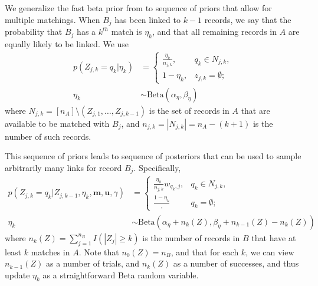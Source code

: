 \documentclass[12pt,letterpaper]{article}
\newcommand{\1}[1]{\mathbb{I}\!\left[#1\right]} %
\begin{document}
We generalize the fast beta prior from \cite{kundinger_2023} to sequence of priors that allow for multiple matchings. When $B_j$ has been linked to $k-1$ records, we say that the probability that $B_j$ has a $k^{th}$ match is $\eta_k$, and that all remaining records in $A$ are equally likely to be linked. We use
\begin{align} \label{eqn:sequential_prior}
	p(Z_{j, k} = q_k|\eta_k) &= \begin{cases}
		\frac{\eta_k}{n_{j, k}}, &  q_k \in N_{j, k}, \\
		1 - \eta_k, & z_{j, k} = \emptyset;
	\end{cases} \\
	\eta_k &\sim \text{Beta}(\alpha_{\eta}, \beta_{\eta})
\end{align}
where $N_{j, k} = [n_A] \setminus (Z_{j, 1}, \ldots, Z_{j, k-1})$ is the set of records in $A$ that are available to be matched with $B_j$, and $n_{j, k} = |N_{j, k}| = n_A - (k + 1)$ is the number of such records. 

This sequence of priors leads to sequence of posteriors that can be used to sample arbitrarily many links for record $B_j$. Specifically,
\begin{align} \label{eqn:sequential_posterior}
	p(Z_{j, k} = q_k|Z_{j, k-1}, \eta_k, \bm{m}, \bm{u}, \gamma) &= \begin{cases}
		\frac{\eta_k}{n_{j, k}} w_{q_k, j}, & q_k \in N_{j, k}, \\
		\frac{1 - \eta_k}, & q_k= \emptyset;
	\end{cases} \\
	\eta_k &\sim \text{Beta}(\alpha_{\eta} + n_k(Z), \beta_{\eta} + n_{k-1}(Z) - n_k(Z))
\end{align}
where $n_k(Z) = \sum_{j=1}^{n_B} I( |Z_j| \geq k)$ is the number of records in $B$ that have at least $k$ matches in $A$. Note that $n_0(Z) = n_B$, and that for each $k$, we can view $n_{k-1}{(Z)}$ as a number of trials, and $n_{k}{(Z)}$ as a number of successes, and thus update $\eta_k$ as a straightforward Beta random variable. 
\end{document}
